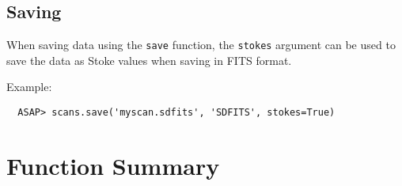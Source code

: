 \documentclass[11pt]{article}
\newcommand{\cmd}[1]{{\tt #1}}
\begin{document}
\subsection{Saving}

When saving data using the \cmd{save} function, the \cmd{stokes}
argument can be used to save the data as Stoke values when saving in
FITS format.

Example:

\begin{verbatim}
  ASAP> scans.save('myscan.sdfits', 'SDFITS', stokes=True)
\end{verbatim}

\section{Function Summary}
\end{document}
